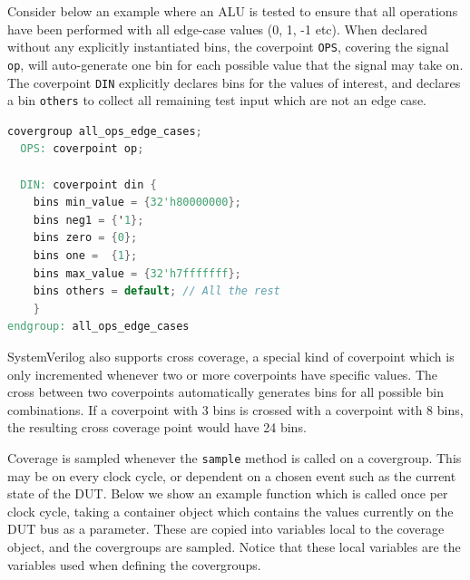 \documentclass[conference]{IEEEtran}
\begin{document}
Consider below an example where an ALU is tested to ensure that all operations have been performed with all edge-case values (0, 1, -1 etc).
When declared without any explicitly instantiated bins, the coverpoint \texttt{OPS}, covering the signal \texttt{op}, will auto-generate one bin for each possible value that the signal may take on. The coverpoint \texttt{DIN} explicitly declares bins for the values of interest, and declares a bin \texttt{others} to collect all remaining test input which are not an edge case.

\begin{lstlisting}[language=verilog]
covergroup all_ops_edge_cases;
  OPS: coverpoint op;

  DIN: coverpoint din {
    bins min_value = {32'h80000000};
    bins neg1 = {'1};
    bins zero = {0};
    bins one =  {1};
    bins max_value = {32'h7fffffff};
    bins others = default; // All the rest
    }
endgroup: all_ops_edge_cases
\end{lstlisting}

SystemVerilog also supports cross coverage, a special kind of coverpoint which is only incremented whenever two or more coverpoints have specific values. The cross between two coverpoints automatically generates bins for all possible bin combinations. If a coverpoint with 3 bins is crossed with a coverpoint with 8 bins, the resulting cross coverage point would have 24 bins.


%  


Coverage is sampled whenever the \texttt{sample} method is called on a covergroup. This may be on every clock cycle, or dependent on a chosen event such as the current state of the DUT. Below we show an example function which is called once per clock cycle, taking a container object which contains the values currently on the DUT bus as a parameter. These are copied into variables local to the coverage object, and the covergroups are sampled. Notice that these local variables are the variables used when defining the covergroups.
\end{document}
